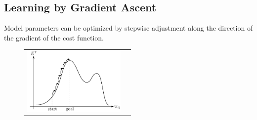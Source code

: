 

\subsection{Learning by Gradient Ascent}


\begin{frame}{\secname}
Model parameters can be optimized by stepwise adjustment along the direction of the gradient of the cost function. 

\begin{figure}[h]
  \centering
  \begin{tabular}[c c]{c c}
   \includegraphics[width=5cm]{img/section2_fig17}
  &\raisebox{2cm}{$\Delta \mathrm{w}_{ij} = \underbrace{ \eta }_{
    \substack{ \text{learning} \\ \text{rate}} }
  \frac{\partial E^T}{\partial \mathrm{w}_{ij}}$}
  \end{tabular}  
  \label{fig:gradientDescent}
\end{figure}

\end{frame}

